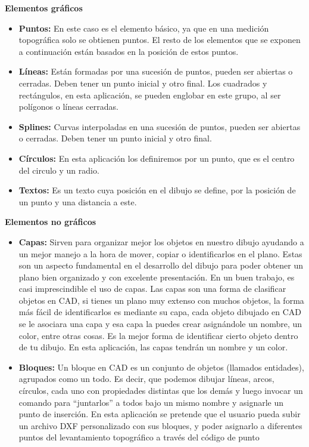 \textbf {Elementos gráficos}
\begin{itemize}
\item\textbf{Puntos:} En este caso es el elemento básico, ya que en una medición topográfica solo se obtienen puntos. El resto de los elementos que se exponen a continuación están basados en la posición de estos puntos.

\item\textbf{Líneas:} Están formadas por una sucesión de puntos, pueden ser abiertas o cerradas. Deben tener un punto inicial y otro final. Los cuadrados y rectángulos, en esta aplicación, se pueden englobar en este grupo, al ser polígonos o líneas cerradas.

\item\textbf{Splines:} Curvas interpoladas en una sucesión de puntos, pueden ser abiertas o cerradas. Deben tener un punto inicial y otro final.

\item\textbf{Círculos:} En esta aplicación los definiremos por un punto, que es el centro del circulo y un radio.

\item\textbf{Textos:} Es un texto cuya posición en el dibujo se define, por la posición de un punto y una distancia a este.

\end{itemize}

\textbf {Elementos no gráficos}

\begin{itemize}

\item\textbf{Capas:} Sirven para organizar mejor los objetos en nuestro dibujo ayudando a un mejor manejo a la hora de mover, copiar o identificarlos en el plano. Estas son un aspecto fundamental en el desarrollo del dibujo para poder obtener un plano bien organizado y con excelente presentación. En un buen trabajo, es casi imprescindible el uso de capas.
Las capas son una forma de clasificar objetos en CAD, si tienes un plano muy extenso con muchos objetos, la forma más fácil de identificarlos es mediante su capa, cada objeto dibujado en CAD se le asociara una capa y esa capa la puedes crear asignándole un nombre, un color, entre otras cosas. Es la mejor forma de identificar cierto objeto dentro de tu dibujo.
En esta aplicación, las capas tendrán un nombre y un color.


\item\textbf{Bloques:} Un bloque en CAD es un conjunto de objetos (llamados entidades), agrupados como un todo. Es decir, que podemos dibujar líneas, arcos, círculos, cada uno con propiedades distintas que los demás y luego invocar un comando para “juntarlos” a todos bajo un mismo nombre y asignarle un punto de inserción.
En esta aplicación se pretende que el usuario pueda subir un archivo DXF personalizado con sus bloques, y poder asignarlo a diferentes puntos del levantamiento topográfico a través del código de punto

\end{itemize}

